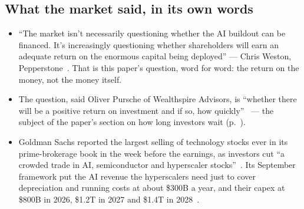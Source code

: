 \documentclass[11pt,letterpaper]{article}
\begin{document}
\subsection*{What the market said, in its own words}\label{news:words}
\begin{itemize}
\item ``The market isn't necessarily questioning whether the AI buildout can be financed. It's increasingly questioning whether shareholders will earn an adequate return on the enormous capital being deployed'' --- Chris Weston, Pepperstone~\cite{ref:yahoo_1030}. That is this paper's question, word for word: the return on the money, not the money itself.
\item The question, said Oliver Pursche of Wealthspire Advisors, is ``whether there will be a positive return on investment and if so, how quickly''~\cite{ref:techinsider_oct} --- the subject of the paper's section on how long investors wait (p.~\pageref{ag:cum}).
\item Goldman Sachs reported the largest selling of technology stocks ever in its prime-brokerage book in the week before the earnings, as investors cut ``a crowded trade in AI, semiconductor and hyperscaler stocks''~\cite{ref:gs_privorotsky}. Its September framework put the AI revenue the hyperscalers need just to cover depreciation and running costs at about \$300B a year, and their capex at \$800B in 2026, \$1.2T in 2027 and \$1.4T in 2028~\cite{ref:gs_capex_bbg,ref:gs_hammond_yahoo}.
\end{itemize}
\end{document}
